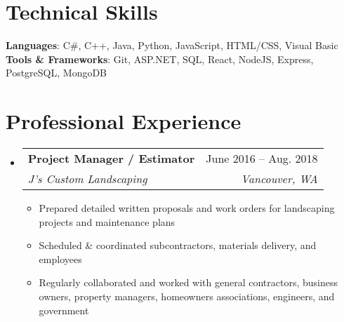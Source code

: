 \documentclass[letterpaper,11pt]{article}
\makeatletter
\newcommand{\resumeItem}[1]{
  \item\small{
    {#1 \vspace{-2pt}}
  }
}
\newcommand{\resumeSubheading}[4]{
  \vspace{-2pt}\item
    \begin{tabular*}{0.97\textwidth}[t]{l@{\extracolsep{\fill}}r}
      \textbf{#1} & #2 \\
      \textit{\small#3} & \textit{\small #4} \\
    \end{tabular*}\vspace{-7pt}
}
\newcommand{\resumeSubHeadingListStart}{\begin{itemize}[leftmargin=0.15in, label={}]}
\newcommand{\resumeSubHeadingListEnd}{\end{itemize}}
\newcommand{\resumeItemListStart}{\begin{itemize}}
\newcommand{\resumeItemListEnd}{\end{itemize}\vspace{-5pt}}
\makeatother
\begin{document}
%
\section{Technical Skills}
 \begin{itemize}[leftmargin=0.15in, label={}]
    \small{\item{
     \textbf{Languages}{: C\#, C++, Java, Python, JavaScript, HTML/CSS, Visual Basic} \\
     \textbf{Tools \& Frameworks}{: Git, ASP.NET, SQL, React, NodeJS, Express, PostgreSQL, MongoDB} \\
    }}
 \end{itemize}
\section{Professional Experience}
  \resumeSubHeadingListStart

    \resumeSubheading
      {Project Manager / Estimator}{June 2016 -- Aug. 2018}
      {J's Custom Landscaping}{Vancouver, WA}
      \resumeItemListStart
        \resumeItem{Prepared detailed written proposals and work orders for landscaping projects and maintenance plans}
        \resumeItem{Scheduled \& coordinated subcontractors, materials delivery, and employees}
        \resumeItem{Regularly collaborated and worked with general contractors, business owners, property managers, homeowners associations, engineers, and government}
      \resumeItemListEnd

  \resumeSubHeadingListEnd

\end{document}
